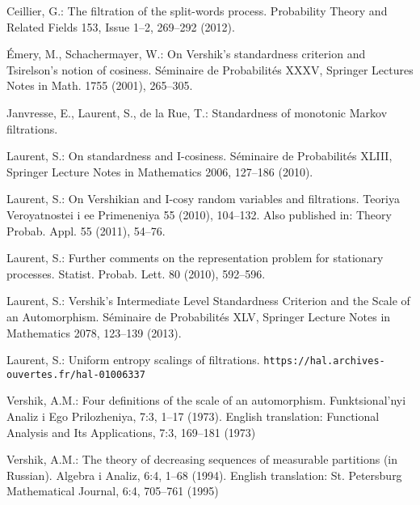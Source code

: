 \documentclass[12pt,a4paper]{article}
\begin{document}
\begin{thebibliography}{99.}

Ceillier, G.:
The filtration of the split-words process. 
Probability Theory and Related Fields 153, Issue 1--2, 
 269--292 (2012).

 \'{E}mery, M.,  Schachermayer, W.: 
On Vershik's standardness criterion and Tsirelson's  notion of cosiness. 
 S\'eminaire de Probabilit\'es XXXV,  
Springer Lectures Notes in Math. 1755 (2001), 
265--305.

Janvresse, E., Laurent, S., de la Rue, T.:
Standardness of monotonic Markov filtrations. 


 Laurent, S.: 
On standardness and I-cosiness. S\'eminaire de Probabilit\'es XLIII, 
Springer Lecture Notes in Mathematics 2006, 
127--186 (2010).

 Laurent, S.: 
On Vershikian and I-cosy random variables and filtrations.
Teoriya Veroyatnostei i ee Primeneniya 55 (2010), 104--132. 
Also published in: Theory Probab. Appl. 55 (2011), 54--76.

Laurent, S.: 
Further comments on the representation problem for stationary processes. 
Statist. Probab. Lett. 80 (2010),  592--596. 

Laurent, S.: 
Vershik's Intermediate Level Standardness Criterion and the Scale of an Automorphism. 
S\'eminaire de Probabilit\'es XLV,
Springer Lecture Notes in Mathematics 2078,
123--139 (2013).

Laurent, S.: 
Uniform entropy scalings of filtrations. 
\verb+https://hal.archives-ouvertes.fr/hal-01006337+ 

Vershik, A.M.: 
Four definitions of the scale of an automorphism. 
Funktsional'nyi Analiz i Ego Prilozheniya, 7:3, 
1--17 (1973). 
English translation:    
Functional Analysis and Its Applications, 7:3, 169--181 (1973)

Vershik, A.M.: 
The theory of decreasing sequences of measurable partitions (in Russian). 
 Algebra i Analiz,  6:4, 1--68 (1994). 
English translation:  St. Petersburg Mathematical Journal, 6:4, 705--761 (1995)


\end{thebibliography}
\end{document}
